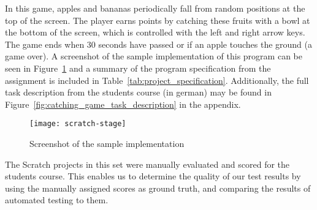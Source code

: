 In this game, apples and bananas periodically fall from random positions at the top of the screen.
The player earns points by catching these fruits with a bowl at the bottom of the screen,
which is controlled with the left and right arrow keys.
The game ends when 30 seconds have passed or if an apple touches the ground (a game over).
A screenshot of the sample implementation of this program can be seen in Figure~\ref{fig:screenshot_of_the_sample_implementation}
and a summary of the program specification from the assignment is included in Table~\ref{tab:project_specification}.
Additionally, the full task description from the students course (in german) may be found in Figure~\ref{fig:catching_game_task_description} in the appendix.
\parspace

\begin{figure}[htpb]
    \centering
    \texttt{[image: scratch-stage]}
    \caption{Screenshot of the sample implementation}
    \label{fig:screenshot_of_the_sample_implementation}
\end{figure}

The Scratch projects in this set were manually evaluated and scored for the students course.
This enables us to determine the quality of our test results by using the manually assigned scores as ground truth,
and comparing the results of automated testing to them.
\parspace

